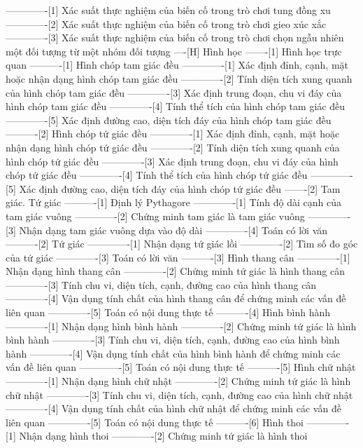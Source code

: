 -------------[1] Xác suất thực nghiệm của biến cố trong trò chơi tung đồng xu
-------------[2] Xác suất thực nghiệm của biến cố trong trò chơi gieo xúc xắc
-------------[3] Xác suất thực nghiệm của biến cố trong trò chơi chọn ngẫu nhiên một đối tượng từ một nhóm đối tượng
----[H] Hình học
-------[1] Hình học trực quan
----------[1] Hình chóp tam giác đều
-------------[1] Xác định đỉnh, cạnh, mặt hoặc nhận dạng hình chóp tam giác đều
-------------[2] Tính diện tích xung quanh của hình chóp tam giác đều
-------------[3] Xác định trung đoạn, chu vi đáy của hình chóp tam giác đều
-------------[4] Tính thể tích của hình chóp tam giác đều
-------------[5] Xác định đường cao, diện tích đáy của hình chóp tam giác đều
----------[2] Hình chóp tứ giác đều
-------------[1] Xác định đỉnh, cạnh, mặt hoặc nhận dạng hình chóp tứ giác đều
-------------[2] Tính diện tích xung quanh của hình chóp tứ giác đều
-------------[3] Xác định trung đoạn, chu vi đáy của hình chóp tứ giác đều
-------------[4] Tính thể tích của hình chóp tứ giác đều
-------------[5] Xác định đường cao, diện tích đáy của hình chóp tứ giác đều
-------[2] Tam giác. Tứ giác
----------[1] Định lý Pythagore
-------------[1] Tính độ dài cạnh của tam giác vuông
-------------[2] Chứng minh tam giác là tam giác vuông
-------------[3] Nhận dạng tam giác vuông dựa vào độ dài
-------------[4] Toán có lời văn
----------[2] Tứ giác
-------------[1] Nhận dạng tứ giác lồi
-------------[2] Tìm số đo góc của tứ giác
-------------[3] Toán có lời văn
----------[3] Hình thang cân
-------------[1] Nhận dạng hình thang cân
-------------[2] Chứng minh tứ giác là hình thang cân
-------------[3] Tính chu vi, diện tích, cạnh, đường cao của hình thang cân
-------------[4] Vận dụng tính chất của hình thang cân để chứng minh các vấn đề liên quan
-------------[5] Toán có nội dung thực tế
----------[4] Hình bình hành
-------------[1] Nhận dạng hình bình hành
-------------[2] Chứng minh tứ giác là hình bình hành
-------------[3] Tính chu vi, diện tích, cạnh, đường cao của hình bình hành
-------------[4] Vận dụng tính chất của hình bình hành để chứng minh các vấn đề liên quan
-------------[5] Toán có nội dung thực tế
----------[5] Hình chữ nhật
-------------[1] Nhận dạng hình chữ nhật
-------------[2] Chứng minh tứ giác là hình chữ nhật
-------------[3] Tính chu vi, diện tích, cạnh, đường cao của hình chữ nhật
-------------[4] Vận dụng tính chất của hình chữ nhật để chứng minh các vấn đề liên quan
-------------[5] Toán có nội dung thực tế
----------[6] Hình thoi
-------------[1] Nhận dạng hình thoi
-------------[2] Chứng minh tứ giác là hình thoi
